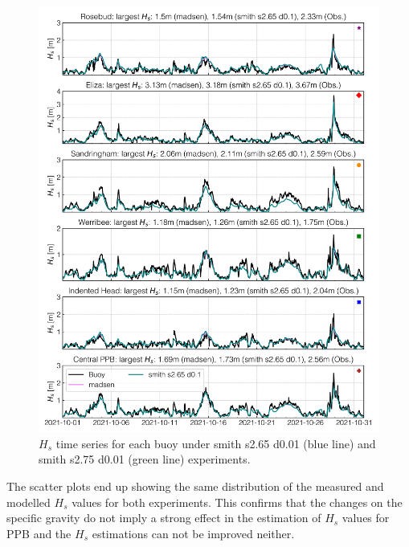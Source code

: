\documentclass[12pt]{article}
\begin{document}
\begin{figure}[h]
    \centering
    \includegraphics[scale=0.7]{plots/hs_series/madsen_vs_smith s2.65 d0.1_vert.png}
    \caption{$H_{s}$ time series for each buoy under smith s2.65 d0.01 (blue line) and smith s2.75 d0.01 (green line) experiments.}
    \label{fig:hs_smith_s2.65_vs_smith_s2.75}
\end{figure}

The scatter plots end up showing the same distribution of the measured and modelled $H_s$ values for both experiments. This confirms that the changes on the specific gravity do not imply a strong effect in the estimation of $H_s$ values for PPB and the $H_s$ estimations can not be improved neither.
\end{document}
